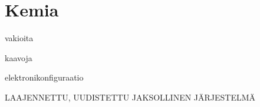 \part*{Kemia}

vakioita

kaavoja

elektronikonfiguraatio



LAAJENNETTU, UUDISTETTU JAKSOLLINEN JÄRJESTELMÄ